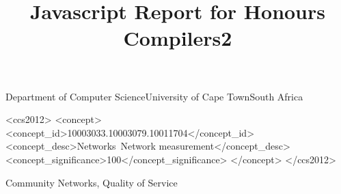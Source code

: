 \documentclass[plain]{sigplanconf}
\begin{document}
	\title{Javascript Report for Honours Compilers2}

	{Department of Computer Science\linebreak University of Cape Town\linebreak South Africa}
	{}
	\maketitle

	\begin{abstract}

	
	\end{abstract}
	\begin{CCSXML}
		<ccs2012>
		<concept>
		<concept_id>10003033.10003079.10011704</concept_id>
		<concept_desc>Networks~Network measurement</concept_desc>
		<concept_significance>100</concept_significance>
		</concept>
		</ccs2012>
	\end{CCSXML}
	\keywords
	Community Networks, Quality of Service




%
%
%
%
	
	
%	
\end{document}

